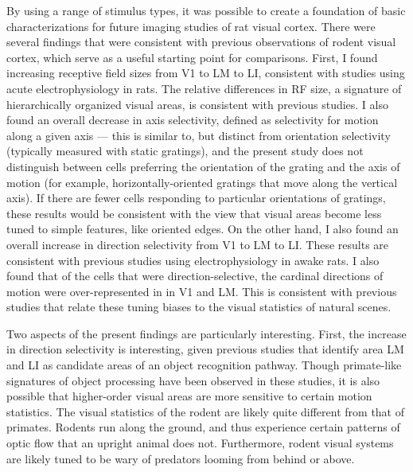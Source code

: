 By using a range of stimulus types, it was possible to create a foundation of basic characterizations for future imaging studies of rat visual cortex. There were several findings that were consistent with previous observations of rodent visual cortex, which serve as a useful starting point for comparisons. First, I found increasing receptive field sizes from V1 to LM to LI, consistent with studies using acute electrophysiology in rats\cite{Vermaercke2014, Tafazoli2017}. The relative differences in RF size, a signature of hierarchically organized visual areas\cite{DiCarlo2012, Siegle2021}, is consistent with previous studies. I also found an overall decrease in axis selectivity, defined as selectivity for motion along a given axis --- this is similar to, but distinct from orientation selectivity (typically measured with static gratings), and the present study does not distinguish between cells preferring the orientation of the grating and the axis of motion (for example, horizontally-oriented gratings that move along the vertical axis). If there are fewer cells responding to particular orientations of gratings, these results would be consistent with the view that visual areas become less tuned to simple features, like oriented edges. On the other hand, I also found an overall increase in direction selectivity from V1 to LM to LI. These results are consistent with previous studies using electrophysiology in awake rats\cite{Vermaercke2014}. I also found that of the cells that were direction-selective, the cardinal directions of motion were over-represented in in V1 and LM. This is consistent with previous studies that relate these tuning biases to the visual statistics of natural scenes.

Two aspects of the present findings are particularly interesting. First, the increase in direction selectivity is interesting, given previous studies that identify area LM and LI as candidate areas of an object recognition pathway\cite{Tafazoli2017,Vermaercke2015, Tafazoli2017}. Though primate-like signatures of object processing have been observed in these studies, it is also possible that higher-order visual areas are more sensitive to certain motion statistics. The visual statistics of the rodent are likely quite different from that of primates. Rodents run along the ground, and thus experience certain patterns of optic flow that an upright animal does not. Furthermore, rodent visual systems are likely tuned to be wary of predators looming from behind or above. 

